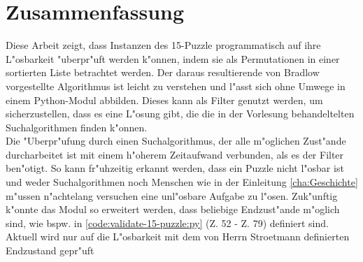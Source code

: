 \chapter{Zusammenfassung}
Diese Arbeit zeigt, dass Instanzen des 15-Puzzle programmatisch auf ihre L"osbarkeit "uberpr"uft werden k"onnen, indem sie als Permutationen in einer sortierten Liste betrachtet werden.
Der daraus resultierende von Bradlow vorgestellte Algorithmus ist leicht zu verstehen und l"asst sich ohne Umwege in einem Python-Modul abbilden. Dieses kann als Filter genutzt werden, um sicherzustellen, dass es eine L"osung gibt, die die in der Vorlesung behandeltelten Suchalgorithmen \cite[vgl.][Kap. 2]{github-stroetmann:online} finden  k"onnen.\\
Die "Uberpr"ufung durch einen Suchalgorithmus, der alle m"oglichen Zust"ande durcharbeitet ist mit einem h"oherem Zeitaufwand verbunden, als es der Filter ben"otigt.
So kann fr"uhzeitig erkannt werden, dass ein Puzzle nicht l"osbar ist und weder Suchalgorithmen noch Menschen wie in der Einleitung \ref{cha:Geschichte} m"ussen n"achtelang versuchen eine unl"osbare Aufgabe zu l"osen.
\WNL
Zuk"unftig k"onnte das Modul so erweitert werden, dass beliebige Endzust"ande m"oglich sind, wie bspw. in \ref{code:validate-15-puzzle:py} (Z. 52 - Z. 79) definiert sind. Aktuell wird nur auf die L"osbarkeit mit dem von Herrn Stroetmann definierten Endzustand gepr"uft